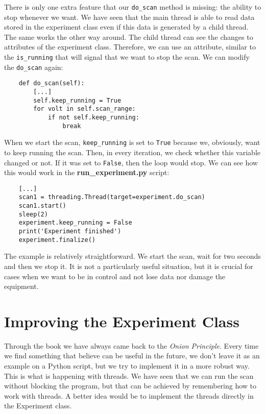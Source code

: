 There is only one extra feature that our \texttt{do\_scan} method is missing: the ability to stop whenever we want. We have seen that the main thread is able to read data stored in the experiment class even if this data is generated by a child thread. The same works the other way around. The child thread can see the changes to attributes of the experiment class. Therefore, we can use an attribute, similar to the \texttt{is\_running} that will signal that we want to stop the scan. We can modify the \texttt{do\_scan} again:

\begin{verbatim}
    def do_scan(self):
        [...]
        self.keep_running = True
        for volt in self.scan_range:
            if not self.keep_running:
                break
\end{verbatim}
When we start the scan, \texttt{keep\_running} is set to \texttt{True} because we, obviously, want to keep running the scan. Then, in every iteration, we check whether this variable changed or not. If it was set to \texttt{False}, then the loop would stop. We can see how this would work in the \textbf{run\_experiment.py} script:

\begin{verbatim}
    [...]
    scan1 = threading.Thread(target=experiment.do_scan)
    scan1.start()
    sleep(2)
    experiment.keep_running = False
    print('Experiment finished')
    experiment.finalize()
\end{verbatim}

The example is relatively straightforward. We start the scan, wait for two seconds and then we stop it. It is not a particularly useful situation, but it is crucial for cases when we want to be in control and not lose data nor damage the equipment.


\section{Improving the Experiment Class}\label{section:improving-experiment}
Through the book we have always came back to the \emph{Onion Principle}. Every time we find something that believe can be useful in the future, we don't leave it as an example on a Python script, but we try to implement it in a more robust way. This is what is happening with threads. We have seen that we can run the scan without blocking the program, but that can be achieved by remembering how to work with threads. A better idea would be to implement the threads directly in the Experiment class.

